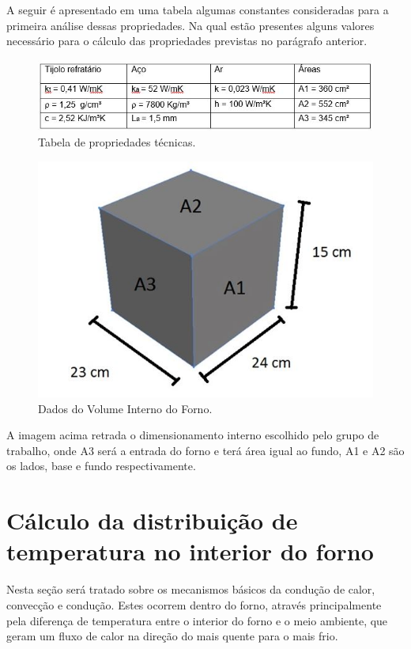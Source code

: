 A seguir é apresentado em uma tabela algumas constantes consideradas para a primeira análise dessas propriedades. Na qual estão presentes alguns valores necessário para o cálculo das propriedades previstas no parágrafo anterior.

\begin{figure}[h]
	\centering
	\label{tab_constantes}
	\includegraphics[keepaspectratio=true,scale=1.0]{figuras/tab_constantes.JPG}
	\caption{Tabela de propriedades técnicas.}
\end{figure}

\begin{figure}[h]
	\centering
	\label{vol_interno}
	\includegraphics[keepaspectratio=true,scale=1.0]{figuras/vol_interno.JPG}
	\caption{Dados do Volume Interno do Forno.}
\end{figure}

A imagem acima retrada o dimensionamento interno escolhido pelo grupo de trabalho, onde A3 será a entrada do forno e terá área igual ao fundo, A1 e A2 são os lados, base e fundo respectivamente. 

\section{Cálculo da distribuição de temperatura no interior do forno}

Nesta seção será tratado sobre os mecanismos básicos da condução de calor, convecção e condução. Estes ocorrem dentro do forno, através principalmente pela diferença de temperatura entre o interior do forno e o meio ambiente, que geram um fluxo de calor na direção do mais quente para o mais frio.

